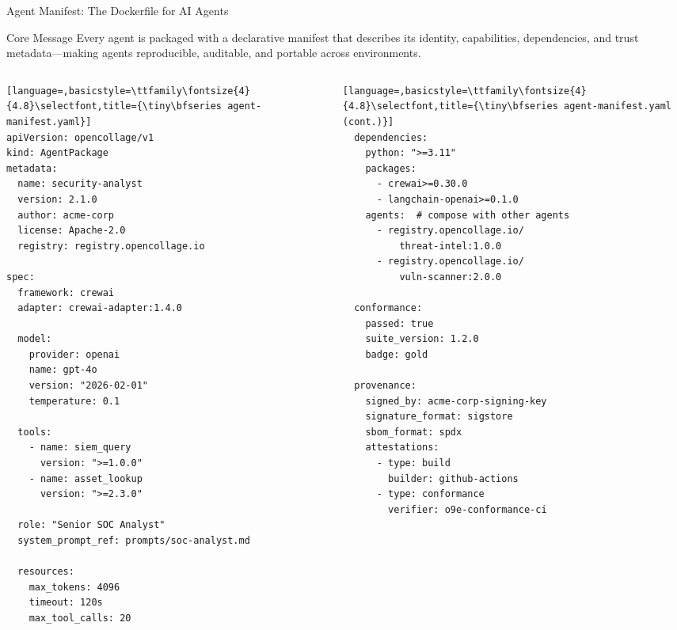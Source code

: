 \begin{frame}[fragile]{\fontsize{10}{12}\selectfont Agent Manifest: The Dockerfile for AI Agents}
  \vspace{-0.1cm}
  \begin{block}{\scriptsize Core Message}
    \scriptsize
    Every agent is packaged with a declarative manifest that describes its identity,
    capabilities, dependencies, and trust metadata---making agents reproducible,
    auditable, and portable across environments.
  \end{block}

  \vspace{-0.5cm}

  \begin{columns}[T]
    \begin{column}{0.50\textwidth}
      \begin{lstlisting}[language=,basicstyle=\ttfamily\fontsize{4}{4.8}\selectfont,title={\tiny\bfseries agent-manifest.yaml}]
apiVersion: opencollage/v1
kind: AgentPackage
metadata:
  name: security-analyst
  version: 2.1.0
  author: acme-corp
  license: Apache-2.0
  registry: registry.opencollage.io

spec:
  framework: crewai
  adapter: crewai-adapter:1.4.0

  model:
    provider: openai
    name: gpt-4o
    version: "2026-02-01"
    temperature: 0.1

  tools:
    - name: siem_query
      version: ">=1.0.0"
    - name: asset_lookup
      version: ">=2.3.0"

  role: "Senior SOC Analyst"
  system_prompt_ref: prompts/soc-analyst.md

  resources:
    max_tokens: 4096
    timeout: 120s
    max_tool_calls: 20
      \end{lstlisting}
    \end{column}
    \begin{column}{0.50\textwidth}
      \begin{lstlisting}[language=,basicstyle=\ttfamily\fontsize{4}{4.8}\selectfont,title={\tiny\bfseries agent-manifest.yaml (cont.)}]
  dependencies:
    python: ">=3.11"
    packages:
      - crewai>=0.30.0
      - langchain-openai>=0.1.0
    agents:  # compose with other agents
      - registry.opencollage.io/
          threat-intel:1.0.0
      - registry.opencollage.io/
          vuln-scanner:2.0.0

  conformance:
    passed: true
    suite_version: 1.2.0
    badge: gold

  provenance:
    signed_by: acme-corp-signing-key
    signature_format: sigstore
    sbom_format: spdx
    attestations:
      - type: build
        builder: github-actions
      - type: conformance
        verifier: o9e-conformance-ci
      \end{lstlisting}


\end{column}
\end{columns}
\end{frame}
